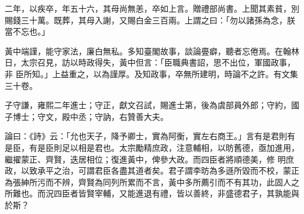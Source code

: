 \begin{pinyinscope}
 二年，以疾卒，年五十六，其母尚無恙，卒如上言。贈禮部尚書。上聞其素貧，別賜錢三十萬。既葬，其母入謝，又賜白金三百兩。上謂之曰：「勿以諸孫為念，朕當不忘也。」



 黃中端謹，能守家法，廉白無私。多知臺閣故事，談論亹癖，聽者忘倦焉。在翰林日，太宗召見，訪以時政得失，黃中但言：「臣職典書詔，思不出位，軍國政事，非
 臣所知。」上益重之，以為謹厚。及知政事，卒無所建明，時論不之許。有文集三十卷。



 子守謙，雍熙二年進士；守正，獻文召試，賜進士第，後為虞部員外郎；守約，國子博士；守文，殿中丞；守訥，右贊善大夫。



 論曰：《詩》云：「允也天子，降予卿士，實為阿衡，實左右商王。」言有是君則有是臣，有是臣則足以相是君也。太宗勵精庶政，注意輔相，以昉舊德，亟加進用，繼擢蒙正、齊賢，迭居相位；復進黃中，俾參大政。而四臣者將順德美，修
 明庶政，以致承平之治，可謂君臣各盡其道者矣。君子謂李昉為多遜所毀而不校，蒙正為張紳所污而不辨，齊賢為同列所累而不言，黃中多所薦引而不有其功，此固人之所難也。而況四臣者皆賢宰輔，又能進退有禮，皆以善終，非盛德君子，其孰能與於斯？



\end{pinyinscope}